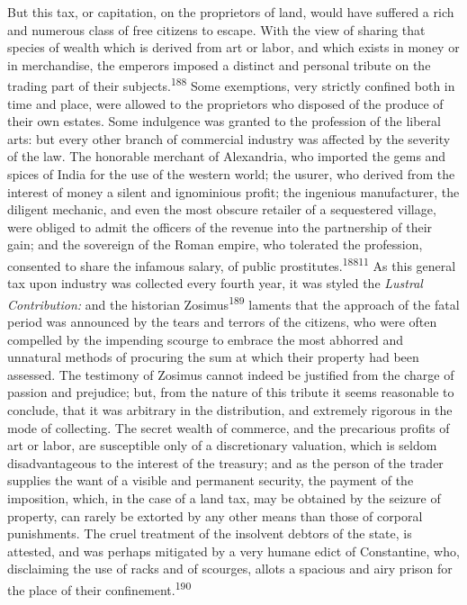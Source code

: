 But this tax, or capitation, on the proprietors of land, would
have suffered a rich and numerous class of free citizens to
escape. With the view of sharing that species of wealth which is
derived from art or labor, and which exists in money or in
merchandise, the emperors imposed a distinct and personal tribute
on the trading part of their subjects.\textsuperscript{188} Some exemptions, very
strictly confined both in time and place, were allowed to the
proprietors who disposed of the produce of their own estates.
Some indulgence was granted to the profession of the liberal
arts: but every other branch of commercial industry was affected
by the severity of the law. The honorable merchant of Alexandria,
who imported the gems and spices of India for the use of the
western world; the usurer, who derived from the interest of money
a silent and ignominious profit; the ingenious manufacturer, the
diligent mechanic, and even the most obscure retailer of a
sequestered village, were obliged to admit the officers of the
revenue into the partnership of their gain; and the sovereign of
the Roman empire, who tolerated the profession, consented to
share the infamous salary, of public prostitutes.\textsuperscript{18811} As this
general tax upon industry was collected every fourth year, it was
styled the \textit{Lustral Contribution:} and the historian Zosimus\textsuperscript{189}
laments that the approach of the fatal period was announced by
the tears and terrors of the citizens, who were often compelled
by the impending scourge to embrace the most abhorred and
unnatural methods of procuring the sum at which their property
had been assessed. The testimony of Zosimus cannot indeed be
justified from the charge of passion and prejudice; but, from the
nature of this tribute it seems reasonable to conclude, that it
was arbitrary in the distribution, and extremely rigorous in the
mode of collecting. The secret wealth of commerce, and the
precarious profits of art or labor, are susceptible only of a
discretionary valuation, which is seldom disadvantageous to the
interest of the treasury; and as the person of the trader
supplies the want of a visible and permanent security, the
payment of the imposition, which, in the case of a land tax, may
be obtained by the seizure of property, can rarely be extorted by
any other means than those of corporal punishments. The cruel
treatment of the insolvent debtors of the state, is attested, and
was perhaps mitigated by a very humane edict of Constantine, who,
disclaiming the use of racks and of scourges, allots a spacious
and airy prison for the place of their confinement.\textsuperscript{190}

